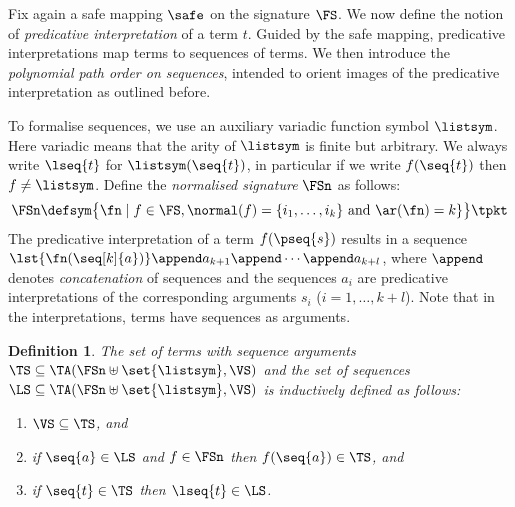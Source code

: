 \documentclass{LMCS}
\newtheorem{definition}[thm]{Definition}
\begin{document}
Fix again a safe mapping $\safe$ on the signature $\FS$.
We now define the notion of \emph{predicative interpretation} of a term $t$.
Guided by the safe mapping, predicative interpretations map terms to sequences of terms.
We then introduce the \emph{polynomial path order on sequences}, 
intended to orient images of the predicative interpretation as outlined before.

To formalise sequences, we use an auxiliary variadic function symbol
$\listsym$.  Here variadic means that the arity of
$\listsym$ is finite but arbitrary.  We always write $\lseq{t}$
for $\listsym(\seq{t})$, in particular if we write $f(\seq{t})$ then $f \not=\listsym$.
Define the \emph{normalised signature} $\FSn$ as follows:
\begin{equation*}
  \FSn \defsym \bigl\{ \fn \mid f \in \FS, \normal(f) = \{i_1,\dots,i_k\} \text{ and } \ar(\fn) = k \}\bigr\}
\tpkt
\end{equation*}
The predicative interpretation of a term $f(\pseq{s})$ results in a sequence
$\lst{\fn(\seq[k]{a})} \append a_{k+1} \append \cdots \append a_{k+l}$, 
where $\append$ denotes \emph{concatenation} of sequences and the 
sequences $a_i$ are predicative interpretations of the corresponding arguments $s_i$ ($i = 1,\dots,k+l$).
Note that in the interpretations, terms have sequences as arguments. 

\begin{definition}\label{d:sequencedterms}
  The set of \emph{terms with sequence arguments}
  $\TS \subseteq \TA(\FSn \uplus \set{\listsym},\VS)$
  and the set of \emph{sequences} $\LS  \subseteq \TA(\FSn \uplus \set{\listsym},\VS)$ is inductively defined as follows:
  \begin{enumerate}[labelsep=*,leftmargin=*]
  \item $\VS \subseteq \TS$, and
  \item if $\seq{a} \in \LS$ and $f \in \FSn$ then $f(\seq{a}) \in \TS$, and
  \item if $\seq{t} \in \TS$ then $\lseq{t} \in \LS$.
  \end{enumerate}
\end{definition}
\end{document}
